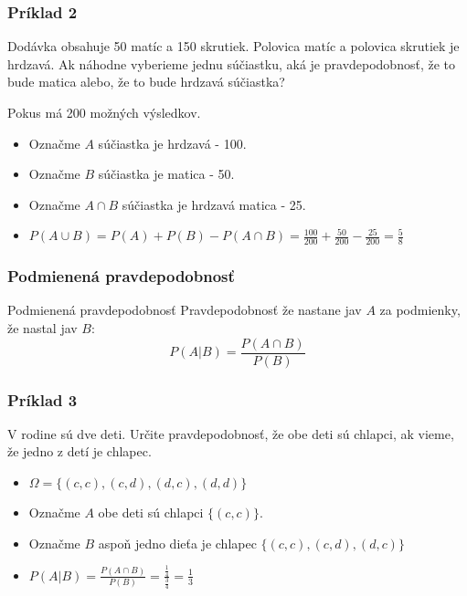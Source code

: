 \documentclass{beamer}
\begin{document}
\begin{frame}
\frametitle{Príklad 2}
Dodávka obsahuje 50 matíc a 150 skrutiek. Polovica matíc a polovica skrutiek je hrdzavá. Ak náhodne vyberieme jednu súčiastku, aká je pravdepodobnosť, že to bude matica alebo, že to bude hrdzavá súčiastka?

 Pokus má 200 možných výsledkov.  \\
\begin{itemize}
\item<3-> Označme $A$ súčiastka je hrdzavá - 100.
\item<3-> Označme $B$ súčiastka je matica - 50.
\item<4-> Označme $A \cap B$ súčiastka je hrdzavá matica - 25.
\item<5-> $P(A \cup B) = P(A) + P(B) - P(A \cap B) = \frac{100}{200} + \frac{50}{200} - \frac{25}{200} = \frac{5}{8}$
\end{itemize}
\end{frame}


\begin{frame}
\frametitle{Podmienená pravdepodobnosť}

\begin{block}{Podmienená pravdepodobnosť}
Pravdepodobnosť že nastane jav $A$ za podmienky, že nastal jav $B$:
\begin{equation*}
 P(A|B) = \frac{P(A \cap B)}{P(B)}
\end{equation*}
\end{block}
\end{frame}

\begin{frame}
\frametitle{Príklad 3}
V rodine sú dve deti. Určite pravdepodobnosť, že obe deti sú chlapci, ak vieme, že jedno z detí je chlapec.
\begin{itemize}
\item<2-> $\Omega = \{ (c,c), (c,d), (d,c), (d,d) \} $ \\
\item<3-> Označme $A$ obe deti sú chlapci $\{(c,c)\}$.
\item<3-> Označme $B$ aspoň jedno dieťa je chlapec  $\{ (c,c), (c,d), (d,c) \} $ 
\item<4-> $P(A | B) = \frac{P(A \cap B)}{P(B)} = \frac{\frac{1}{4}}{\frac{3}{4}} = \frac{1}{3}$
\end{itemize}
\end{frame}
\end{document}
